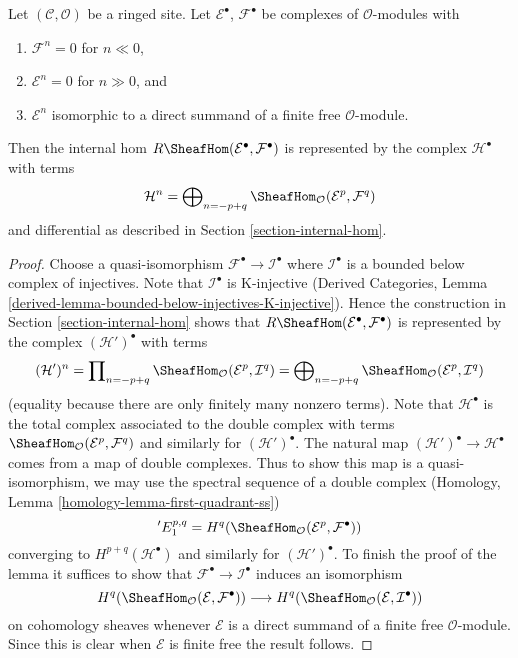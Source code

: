 \begin{lemma}
\label{lemma-Rhom-complex-of-direct-summands-finite-free}
Let $(\mathcal{C}, \mathcal{O})$ be a ringed site.
Let $\mathcal{E}^\bullet$, $\mathcal{F}^\bullet$ be complexes
of $\mathcal{O}$-modules with
\begin{enumerate}
\item $\mathcal{F}^n = 0$ for $n \ll 0$,
\item $\mathcal{E}^n = 0$ for $n \gg 0$, and
\item $\mathcal{E}^n$ isomorphic to a direct summand of a finite
free $\mathcal{O}$-module.
\end{enumerate}
Then the internal hom $R\SheafHom(\mathcal{E}^\bullet, \mathcal{F}^\bullet)$
is represented by the complex $\mathcal{H}^\bullet$ with terms
$$
\mathcal{H}^n =
\bigoplus\nolimits_{n = - p + q}
\SheafHom_\mathcal{O}(\mathcal{E}^p, \mathcal{F}^q)
$$
and differential as described in Section \ref{section-internal-hom}.
\end{lemma}

\begin{proof}
Choose a quasi-isomorphism $\mathcal{F}^\bullet \to \mathcal{I}^\bullet$
where $\mathcal{I}^\bullet$ is a bounded below complex of injectives.
Note that $\mathcal{I}^\bullet$ is K-injective
(Derived Categories, Lemma
\ref{derived-lemma-bounded-below-injectives-K-injective}).
Hence the construction in Section \ref{section-internal-hom}
shows that
$R\SheafHom(\mathcal{E}^\bullet, \mathcal{F}^\bullet)$ is 
represented by the complex $(\mathcal{H}')^\bullet$ with terms
$$
(\mathcal{H}')^n =
\prod\nolimits_{n = - p + q}
\SheafHom_\mathcal{O}(\mathcal{E}^p, \mathcal{I}^q) =
\bigoplus\nolimits_{n = - p + q}
\SheafHom_\mathcal{O}(\mathcal{E}^p, \mathcal{I}^q)
$$
(equality because there are only finitely many nonzero terms).
Note that $\mathcal{H}^\bullet$ is the total complex associated to
the double complex with terms
$\SheafHom_\mathcal{O}(\mathcal{E}^p, \mathcal{F}^q)$
and similarly for $(\mathcal{H}')^\bullet$.
The natural map $(\mathcal{H}')^\bullet \to \mathcal{H}^\bullet$
comes from a map of double complexes.
Thus to show this map is a quasi-isomorphism, we may use the spectral
sequence of a double complex
(Homology, Lemma \ref{homology-lemma-first-quadrant-ss})
$$
{}'E_1^{p, q} =
H^q(\SheafHom_\mathcal{O}(\mathcal{E}^p, \mathcal{F}^\bullet))
$$
converging to $H^{p + q}(\mathcal{H}^\bullet)$ and similarly for
$(\mathcal{H}')^\bullet$. To finish the proof of the lemma it
suffices to show that $\mathcal{F}^\bullet \to \mathcal{I}^\bullet$
induces an isomorphism
$$
H^q(\SheafHom_\mathcal{O}(\mathcal{E}, \mathcal{F}^\bullet))
\longrightarrow
H^q(\SheafHom_\mathcal{O}(\mathcal{E}, \mathcal{I}^\bullet))
$$
on cohomology sheaves whenever $\mathcal{E}$ is a direct summand of a
finite free $\mathcal{O}$-module. Since this is clear when $\mathcal{E}$
is finite free the result follows.
\end{proof}









